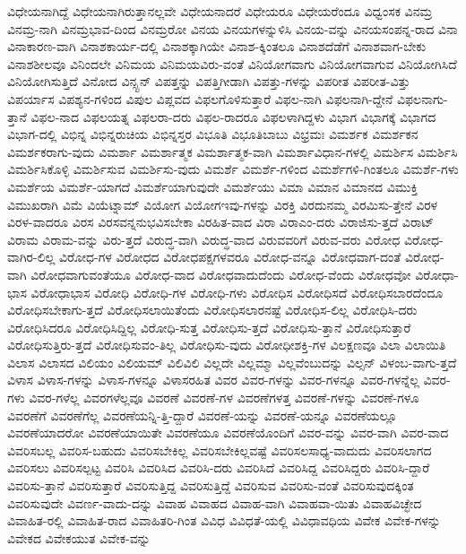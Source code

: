 {ವಿಧೇಯನಾಗಿದ್ದೆ
ವಿಧೇಯನಾಗಿರುತ್ತಾನಲ್ಲವೇ
ವಿಧೇಯನಾದರೆ
ವಿಧೇಯರೂ
ವಿಧೇಯರೆಂದೂ
ವಿಧ್ವಂಸಕ
ವಿನಮ್ರ
ವಿನಮ್ರ-ನಾಗಿ
ವಿನಮ್ರಭಾವ-ದಿಂದ
ವಿನಮ್ರರೋ
ವಿನಯ
ವಿನಯಗಳನ್ನುಳಿಸಿ
ವಿನಯ-ವನ್ನು
ವಿನಯಸಂಪನ್ನ-ರಾದ
ವಿನಾ
ವಿನಾಕಾರಣ-ವಾಗಿ
ವಿನಾಶಕಾರ್ಯ-ದಲ್ಲಿ
ವಿನಾಶಕ್ಕಾಗಿಯೇ
ವಿನಾಶ-ಕ್ಕಿಂತಲೂ
ವಿನಾಶದೆಡೆಗೆ
ವಿನಾಶವಾಗ-ಬೇಕು
ವಿನಾಶಶೀಲವೂ
ವಿನಿಂದಲೇ
ವಿನಿಮಯ
ವಿನಿಮಯವಿರು-ವಂತೆ
ವಿನಿಯೋಗವಾಗು
ವಿನಿಯೋಗವಾಗುವ
ವಿನಿಯೋಗಿಸಿದೆ
ವಿನಿಯೋಗಿಸುತ್ತಿದೆ
ವಿನೋದ
ವಿನ್ಸ್ಟನ್
ವಿಪತ್ತನ್ನು
ವಿಪತ್ತಿಗೀಡಾಗಿ
ವಿಪತ್ತು-ಗಳನ್ನು
ವಿಪರೀತ
ವಿಪರೀತ-ವಿತ್ತು
ವಿಪರ್ಯಾಸ
ವಿಪಶ್ಯನ-ಗಳಿಂದ
ವಿಪುಲ
ವಿಪ್ಲವದ
ವಿಫಲಗೊಳಿಸುತ್ತಾರೆ
ವಿಫಲ-ನಾಗಿ
ವಿಫಲನಾಗಿ-ದ್ದೇನೆ
ವಿಫಲನಾಗು-ತ್ತಾನೆ
ವಿಫಲ-ನಾದ
ವಿಫಲಯತ್ನ
ವಿಫಲರಾ-ದರು
ವಿಫಲ-ರಾದರೂ
ವಿಫಲಳಾಗಿದ್ದಳು
ವಿಭಾಗ
ವಿಭಾಗಕ್ಕೆ
ವಿಭಾಗದ
ವಿಭಾಗ-ದಲ್ಲಿ
ವಿಭಿನ್ನ
ವಿಭಿನ್ನರುಚಿಯ
ವಿಭಿನ್ನಸ್ತರ
ವಿಭೂತಿ
ವಿಭೂತಿಬಾಬು
ವಿಭ್ರಮಃ
ವಿಮರ್ಶಕ
ವಿಮರ್ಶಕನ
ವಿಮರ್ಶಕರಾಗು-ವುದು
ವಿಮರ್ಶಾ
ವಿಮರ್ಶಾತ್ಮಕ
ವಿಮರ್ಶಾತ್ಮಕ-ವಾಗಿ
ವಿಮರ್ಶಾವಿಧಾನ-ಗಳಲ್ಲಿ
ವಿಮರ್ಶಿಸ
ವಿಮರ್ಶಿಸಿ
ವಿಮರ್ಶಿಸಿಕೊಳ್ಳಿ
ವಿಮರ್ಶಿಸುವ
ವಿಮರ್ಶಿಸು-ವುದು
ವಿಮರ್ಶೆ
ವಿಮರ್ಶೆ-ಗಳಿಂದ
ವಿಮರ್ಶೆಗಳಿ-ಗಿಂತಲೂ
ವಿಮರ್ಶೆ-ಗಳು
ವಿಮರ್ಶೆಯ
ವಿಮರ್ಶೆ-ಯಾಗದೆ
ವಿಮರ್ಶೆಯಾಗುವುದೇ
ವಿಮರ್ಶೆಯು
ವಿಮಾ
ವಿಮಾನ
ವಿಮಾನದ
ವಿಮುಕ್ತಿ
ವಿಮುಖರಾಗಿ
ವಿಮೆ
ವಿಯೆಟ್ನಾಮ್
ವಿಯೋಗ
ವಿಯೋಗಇವು-ಗಳನ್ನು
ವಿರಕ್ತಿ
ವಿರದುನಮ್ಮ
ವಿರಮಿಸು-ತ್ತೇನೆ
ವಿರಳ
ವಿರಳ-ವಾದರೂ
ವಿರಸ
ವಿರಸವನ್ನನುಭವಿಸಬೇಕಾ
ವಿರಹಿತ-ವಾದ
ವಿರಾ
ವಿರಾಎಂ-ದರು
ವಿರಾಜಿಸು-ತ್ತದೆ
ವಿರಾಟ್
ವಿರಾಮ
ವಿರಾಮ-ವನ್ನು
ವಿರು-ತ್ತದೆ
ವಿರುದ್ಧ-ವಾಗಿ
ವಿರುದ್ಧ-ವಾದ
ವಿರುವವರಿಗೆ
ವಿರುವ-ವರು
ವಿರೋಧ
ವಿರೋಧ-ವಾಗಿರ-ಲಿಲ್ಲ
ವಿರೋಧ-ಗಳ
ವಿರೋಧದ
ವಿರೋಧಪಕ್ಷಗಳವರೂ
ವಿರೋಧ-ವನ್ನೂ
ವಿರೋಧವಾಗ-ದಂತೆ
ವಿರೋಧ-ವಾಗಿ
ವಿರೋಧವಾಗುವಂತೆಯೂ
ವಿರೋಧ-ವಾದ
ವಿರೋಧವಾದುದೆಂದು
ವಿರೋಧ-ವೆಂದು
ವಿರೋಧವೋ
ವಿರೋಧಾ-ಭಾಸ
ವಿರೋಧಾಭಾಸ
ವಿರೋಧಿ
ವಿರೋಧಿ-ಗಳ
ವಿರೋಧಿ-ಗಳು
ವಿರೋಧಿಸ
ವಿರೋಧಿಸದೆ
ವಿರೋಧಿಸಬಾರದೆಂದೂ
ವಿರೋಧಿಸಬೇಕಾಗು-ತ್ತದೆ
ವಿರೋಧಿಸಲಾಯಿತೆಂದು
ವಿರೋಧಿಸಲಾರನಷ್ಟೆ
ವಿರೋಧಿಸ-ಲಿಲ್ಲ
ವಿರೋಧಿಸಿ-ದರು
ವಿರೋಧಿಸಿದರೂ
ವಿರೋಧಿಸಿದ್ದಿಲ್ಲ
ವಿರೋಧಿ-ಸುತ್ತ
ವಿರೋಧಿಸು-ತ್ತದೆ
ವಿರೋಧಿಸು-ತ್ತಾನೆ
ವಿರೋಧಿಸುತ್ತಾರೆ
ವಿರೋಧಿಸುತ್ತಿರು-ತ್ತದೆ
ವಿರೋಧಿಸುವಂ-ತಿಲ್ಲ
ವಿರೋಧಿಸು-ವುದು
ವಿರೋಧೀಶಕ್ತಿ-ಗಳ
ವಿಲಕ್ಷಣವೂ
ವಿಲಾ
ವಿಲಾಯಿತಿ
ವಿಲಾಸ
ವಿಲಾಸದ
ವಿಲಿಯಂ
ವಿಲಿಯಮ್
ವಿಲಿವಿಲಿ
ವಿಲ್ಲದೇ
ವಿಲ್ಲಮ್ಮಾ
ವಿಲ್ಲವೆಂಬುದನ್ನು
ವಿಲ್ಸನ್
ವಿಳಂಬ-ವಾಗು-ತ್ತದೆ
ವಿಳಾಸ
ವಿಳಾಸ-ಗಳನ್ನು
ವಿಳಾಸ-ಗಳನ್ನೂ
ವಿಳಾಸರಹಿತ
ವಿವರ
ವಿವರ-ಗಳನ್ನು
ವಿವರ-ಗಳನ್ನೂ
ವಿವರ-ಗಳನ್ನೆಲ್ಲ
ವಿವರ-ಗಳು
ವಿವರ-ಗಳೆಲ್ಲ
ವಿವರಗಳೆಲ್ಲವೂ
ವಿವರಣೆ
ವಿವರಣೆ-ಗಳ
ವಿವರಣೆಗಳತ್ತ
ವಿವರಣೆ-ಗಳನ್ನು
ವಿವರಣೆ-ಗಳೂ
ವಿವರಣೆಗೆ
ವಿವರಣೆಗೆಲ್ಲ
ವಿವರಣೆಯನ್ನಿ-ತ್ತಿ-ದ್ದಾರೆ
ವಿವರಣೆ-ಯನ್ನು
ವಿವರಣೆ-ಯನ್ನೂ
ವಿವರಣೆಯಲ್ಲೂ
ವಿವರಣೆಯಾದರೋ
ವಿವರಣೆಯಾಯಿತೇ
ವಿವರಣೆಯೂ
ವಿವರಣೆಯೊಂದಿಗೆ
ವಿವರ-ವನ್ನು
ವಿವರ-ವಾಗಿ
ವಿವರ-ವಾದ
ವಿವರಿಸಬಲ್ಲ
ವಿವರಿಸ-ಬಹುದು
ವಿವರಿಸಬೇಕಿಲ್ಲ
ವಿವರಿಸಬೇಕಿಲ್ಲವಷ್ಟೆ
ವಿವರಿಸಲಸಾಧ್ಯ-ವಾದುದು
ವಿವರಿಸಲಾಗದ
ವಿವರಿಸಲು
ವಿವರಿಸಲ್ಪಟ್ಟ
ವಿವರಿಸಿ
ವಿವರಿಸಿದ
ವಿವರಿಸಿ-ದರು
ವಿವರಿಸಿದೆ
ವಿವರಿಸಿದ್ದ
ವಿವರಿಸಿದ್ದರು
ವಿವರಿಸಿ-ದ್ದಾರೆ
ವಿವರಿಸು-ತ್ತಾನೆ
ವಿವರಿಸುತ್ತಾರೆ
ವಿವರಿಸುತ್ತಿದ್ದ
ವಿವರಿಸುತ್ತಿದ್ದೆ
ವಿವರಿಸುವ
ವಿವರಿಸು-ವಂತೆ
ವಿವರಿಸುವುದಕ್ಕಿಂತ
ವಿವರಿಸುವುದೇ
ವಿವರ್ಣ-ವಾದು-ದನ್ನು
ವಿವಾಹ
ವಿವಾಹದ
ವಿವಾಹ-ವಾಗಿ
ವಿವಾಹವಾ-ಯಿತು
ವಿವಾಹವಿಚ್ಛೇದ
ವಿವಾಹಿತ-ರಲ್ಲಿ
ವಿವಾಹಿತ-ರಾದ
ವಿವಾಹಿತರಿ-ಗಿಂತ
ವಿವಿಧ
ವಿವಿಧತೆ-ಯಲ್ಲಿ
ವಿವಿಧಾವಧಿಯ
ವಿವೇಕ
ವಿವೇಕ-ಗಳನ್ನು
ವಿವೇಕದ
ವಿವೇಕಯುತ
ವಿವೇಕ-ವನ್ನು
}
